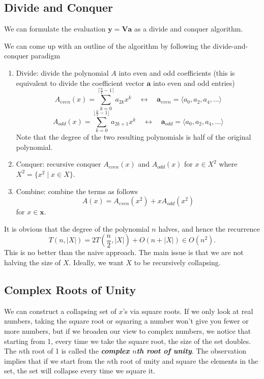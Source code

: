 \subsection{Divide and Conquer}

We can formulate the evaluation $\mathbf{y}=\mathbf{V}\mathbf{a}$ as a divide and conquer algorithm.

We can come up with an outline of the algorithm by following the divide-and-conquer paradigm
\begin{enumerate}
    \item Divide: divide the polynomial $A$ into even and odd coefficients (this is equivalent to divide the coefficient vector $\mathbf{a}$ into even and odd entries)
    $$
    A_{even}(x) = \sum_{k=0}^{\lceil \frac{n}{2}-1 \rceil} a_{2k}x^k \quad \leftrightarrow \quad \mathbf{a}_{even} = \langle a_0,a_2,a_4,\ldots \rangle
    $$
    $$
    A_{odd}(x) = \sum_{k=0}^{\lfloor \frac{n}{2}-1 \rfloor} a_{2k+1}x^k \quad \leftrightarrow \quad \mathbf{a}_{odd} = \langle a_0,a_2,a_4,\ldots \rangle
    $$
    Note that the degree of the two resulting polynomials is half of the original polynomial.

    \item Conquer: recursive conquer $A_{even}(x)$ and $A_{odd}(x)$ for $x \in X^2$ where $X^2 = \{x^2 \mid x \in X\}$.
    
    \item Combine: combine the terms as follows
    $$
    A(x) = A_{even}(x^2) + xA_{odd}(x^2)
    $$
    for $x \in \mathbf{x}$.
\end{enumerate}

It is obvious that the degree of the polynomial $n$ halves, and hence the recurrence
$$
T(n,|X|) = 2T\left( \frac{n}{2},|X| \right) + O(n + |X|) \in O(n^2).
$$
This is no better than the naive approach. The main issue is that we are not halving the size of $X$. Ideally, we want $X$ to be recursively collapsing.

\subsection{Complex Roots of Unity} 

We can construct a collapsing set of $x$'s via square roots. If we only look at real numbers, taking the square root or squaring a number won't give you fewer or more numbers, but if we broaden our view to complex numbers, we notice that starting from 1, every time we take the square root, the size of the set doubles. The $n$th root of 1 is called the \textit{\textbf{complex $n$th root of unity}}. The observation implies that if we start from the $n$th root of unity and square the elements in the set, the set will collapse every time we square it.


